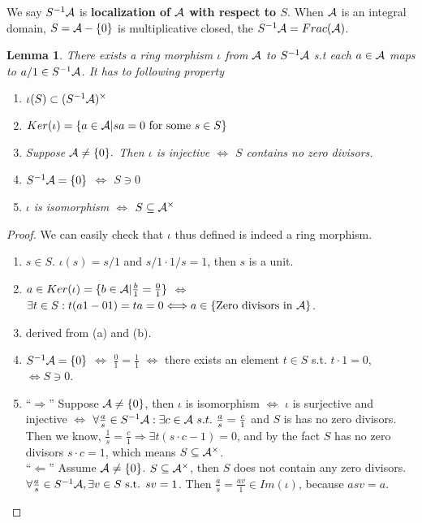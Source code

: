 \documentclass[11pt]{article}
\newtheorem{lemma}[thm]{Lemma}
\newcommand{\cala}{{\cal A}}
\newcommand{\Lrta}{\Longrightarrow}
\newcommand{\Llta}{\Longleftarrow}
\newcommand{\Llrta}{\Longleftrightarrow}
\begin{document}
We say $S^{-1}\cala$ is \textbf{localization of $\cala$ with respect to $S$}.
When $\cala$ is an integral domain, $S=\cala-\{0\}$ is multiplicative closed, the $S^{-1}\cala=Frac(\cala)$.
\begin{lemma}
There exists a ring morphism $\iota$ from $\cala$ to $S^{-1}\cala$ s.t each $a\in \cala$ maps to $a/1\in S^{-1}\cala$.
It has to following property
\begin{enumerate}[label=(\alph*)]
\item $\iota(S)\subset (S^{-1}\cala)^{\times}$
\item $Ker(\iota)=\{a\in \cala|sa=0 \text{ for some }s\in S\}$
\item Suppose $\cala\neq\{0\}.$ Then $\iota$ is injective $\Longleftrightarrow$ $S$ contains no zero divisors.
\item $S^{-1}\cala=\{0\}$ $\Longleftrightarrow$ $S\ni 0$
\item $\iota$ is isomorphism  $\Longleftrightarrow $ $S\subseteq \cala^{\times}$
\end{enumerate}
\end{lemma}
\begin{proof}We can easily check that $\iota$ thus defined is indeed a ring morphism.
\begin{enumerate}[label=(\alph*)]
\item  $s\in S$. $\iota(s)=s/1$ and $s/1\cdot 1/s=1$, then $s$ is a unit.
\item $a\in Ker(\iota)=\{b\in \cala|\frac{b}{1}=\frac{0}{1}\}$ $\Longleftrightarrow$ $\exists t\in S: t(a1-01)=ta=0\Llrta a\in\{\text{Zero divisors in }\cala\}$.
\item  derived from (a) and (b).
\item $S^{-1}\cala=\{0\}$ $\Longleftrightarrow$ $\frac{0}{1}=\frac{1}{1}$ $\Llrta$  there exists an element $t\in S$ s.t. $t\cdot1=0$, $\Longleftrightarrow S\ni 0$.
\item ``$\Lrta$'' Suppose $\cala\neq \{0\}$, then $\iota $ is isomorphism $\Llrta$  $\iota$ is surjective and injective $\Llrta$ $\forall \frac{a}{s}\in S^{-1}\cala: \exists c\in \cala\ s.t.\ \frac{a}{s}=\frac{c}{1}$ and $S$ is has no zero divisors. Then we know, $\frac{1}{s}=\frac{c}{1}\Lrta\exists  t(s\cdot c-1)=0$, and by the fact $S$ has no zero divisors $s\cdot c=1$, which means $S\subseteq \cala^{\times}$.\\
``$\Llta$'' Assume $\cala\neq\{0\}$. $S\subseteq\cala^\times$, then $S$ does not contain any zero divisors. $\forall \frac{a}{s}\in S^{-1}\cala, \exists v\in S \text{ s.t. } sv=1$. Then $ \frac{a}{s}=\frac{av}{1}\in Im(\iota)$, because $a s v=a$.



\end{enumerate}
\end{proof}
\end{document}
